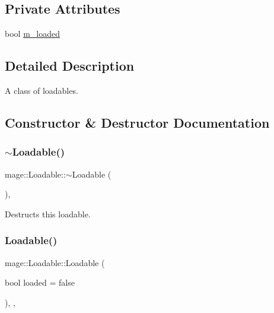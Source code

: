 \subsection*{Private Attributes}
\begin{DoxyCompactItemize}
\item 
bool \hyperlink{classmage_1_1_loadable_a993963fbfeb0f2e2ab9616bf7ef6a0f7}{m\+\_\+loaded}
\end{DoxyCompactItemize}


\subsection{Detailed Description}
A class of loadables. 

\subsection{Constructor \& Destructor Documentation}
\hypertarget{classmage_1_1_loadable_a8088935f7536c0c77ddb34a29ece63b1}{}\label{classmage_1_1_loadable_a8088935f7536c0c77ddb34a29ece63b1} 
\subsubsection{\texorpdfstring{$\sim$\+Loadable()}{~Loadable()}}
{\footnotesize\ttfamily mage\+::\+Loadable\+::$\sim$\+Loadable (\begin{DoxyParamCaption}{ }\end{DoxyParamCaption})\hspace{0.3cm}{\ttfamily [virtual]}, {\ttfamily [default]}}

Destructs this loadable. \hypertarget{classmage_1_1_loadable_a7e702d425db455dbe0630c02a72f9d07}{}\label{classmage_1_1_loadable_a7e702d425db455dbe0630c02a72f9d07} 
\subsubsection{\texorpdfstring{Loadable()}{Loadable()}\hspace{0.1cm}{\footnotesize\ttfamily [1/3]}}
{\footnotesize\ttfamily mage\+::\+Loadable\+::\+Loadable (\begin{DoxyParamCaption}\item[{bool}]{loaded = {\ttfamily false} }\end{DoxyParamCaption})\hspace{0.3cm}{\ttfamily [explicit]}, {\ttfamily [protected]}, {\ttfamily [noexcept]}}

